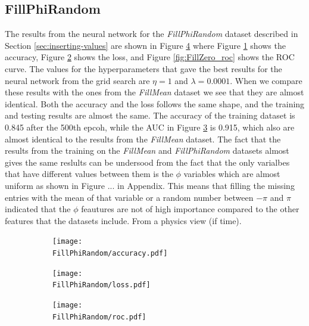 \documentclass[../../main/main.tex]{subfiles}
\begin{document}
\subsection{FillPhiRandom}
\label{sec:fillzero}
The results from the neural network for the \emph{FillPhiRandom} dataset described in Section \ref{sec:inserting-values} are shown in Figure \ref{fig:FillPhiRandom_1} where Figure \ref{fig:FillPhiRandom_acc} shows the accuracy, Figure \ref{fig:FillPhiRandom_loss} shows the loss, and Figure \ref{fig:FillZero_roc} shows the ROC curve. The values for the hyperparameters that gave the best results for the neural network from the grid search are \(\eta=1\) and \(\lambda=0.0001\). When we compare these results with the ones from the \emph{FillMean} dataset we see that they are almost identical. Both the accuracy and the loss follows the same shape, and the training and testing results are almost the same. The accuracy of the training dataset is 0.845 after the 500th epcoh, while the AUC in Figure \ref{fig:FillPhiRandom_roc} is 0.915, which also are almost identical to the results from the \emph{FillMean} dataset. The fact that the results from the training on the \emph{FillMean} and \emph{FillPhiRandom} datasets almost gives the same reslults can be undersood from the fact that the only varialbes that have different values between them is the \(\phi\) variables which are almost uniform as shown in Figure ... in Appendix. This means that filling the missing entries with the mean of that variable or a random number between \(-\pi\) and \(\pi\) indicated that the \(\phi\) feautures are not of high importance compared to the other features that the datasets include. From a physics view (if time).


\begin{figure}[H]
  \centering
  \begin{subfigure}[t]{0.5\textwidth}
    \centering
    \texttt{[image: \\FillPhiRandom/accuracy.pdf]}
    \caption{\captionAcc}
    \label{fig:FillPhiRandom_acc}
  \end{subfigure}
  \vspace{0.01cm}
  \begin{subfigure}[t]{0.5\textwidth}
    \centering
    \texttt{[image: \\FillPhiRandom/loss.pdf]}
    \caption{\captionLoss}
    \label{fig:FillPhiRandom_loss}
  \end{subfigure}
  \begin{subfigure}[t]{0.5\textwidth}
    \centering
    \texttt{[image: \\FillPhiRandom/roc.pdf]}
    \caption{\captionROC}
    \label{fig:FillPhiRandom_roc}
  \end{subfigure}
  \caption{}
  \label{fig:FillPhiRandom_1}  
\end{figure}
\end{document}

